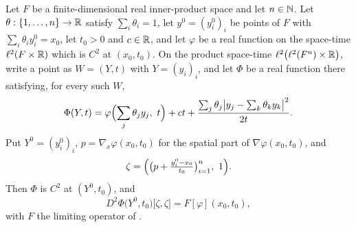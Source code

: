 \begin{lemma}
Let $F$ be a finite-dimensional real inner-product space and let $n\in\mathbb{N}$. Let
$\theta:\{1,\dots,n\}\to\mathbb{R}$ satisfy $\sum_i\theta_i=1$, let $y^0=(y^0_i)_i$ be points of
$F$ with $\sum_i\theta_iy^0_i=x_0$, let $t_0>0$ and $c\in\mathbb{R}$, and let $\varphi$ be a real
function on the space-time $\ell^2(F\times\mathbb{R})$ which is $C^2$ at $(x_0,t_0)$. On the
product space-time $\ell^2\bigl(\ell^2(F^n)\times\mathbb{R}\bigr)$, write a point as $W=(Y,t)$
with $Y=(y_i)_i$, and let $\Phi$ be a real function there satisfying, for every such $W$,
\[
  \Phi(Y,t)=\varphi\Bigl(\sum_j\theta_jy_j,\ t\Bigr)+ct
    +\frac{\sum_j\theta_j\bigl|y_j-\sum_k\theta_ky_k\bigr|^2}{2t}.
\]
Put $Y^0=(y^0_i)_i$, $p=\nabla_x\varphi(x_0,t_0)$ for the spatial part of
$\nabla\varphi(x_0,t_0)$, and
\[
  \zeta=\Bigl(\bigl(p+\tfrac{y^0_i-x_0}{t_0}\bigr)_{i=1}^n,\ 1\Bigr).
\]
Then $\Phi$ is $C^2$ at $(Y^0,t_0)$, and
\[
  D^2\Phi\bigl(Y^0,t_0\bigr)\bigl[\zeta,\zeta\bigr]=F[\varphi](x_0,t_0),
\]
with $F$ the limiting operator of .
\end{lemma}

